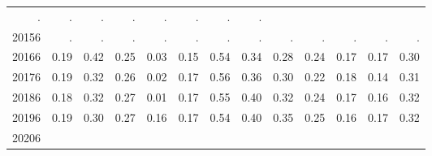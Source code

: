 \begin{table}[!h]
\begin{tabular}{lllllllllllll}
  \multicolumn{1}{r}{.} &
  \multicolumn{1}{r}{.} &
  \multicolumn{1}{r}{.} &
  \multicolumn{1}{r}{.} &
  \multicolumn{1}{r}{.} &
  \multicolumn{1}{r}{.} &
  \multicolumn{1}{r}{.} &
  \multicolumn{1}{r}{.} \\
\multicolumn{1}{l}{\hspace{1em}20156} &
  \multicolumn{1}{|r}{.} &
  \multicolumn{1}{r}{.} &
  \multicolumn{1}{r}{.} &
  \multicolumn{1}{r}{.} &
  \multicolumn{1}{r}{.} &
  \multicolumn{1}{r}{.} &
  \multicolumn{1}{r}{.} &
  \multicolumn{1}{r}{.} &
  \multicolumn{1}{r}{.} &
  \multicolumn{1}{r}{.} &
  \multicolumn{1}{r}{.} &
  \multicolumn{1}{r}{.} \\
\multicolumn{1}{l}{\hspace{1em}20166} &
  \multicolumn{1}{|r}{0.19} &
  \multicolumn{1}{r}{0.42} &
  \multicolumn{1}{r}{0.25} &
  \multicolumn{1}{r}{0.03} &
  \multicolumn{1}{r}{0.15} &
  \multicolumn{1}{r}{0.54} &
  \multicolumn{1}{r}{0.34} &
  \multicolumn{1}{r}{0.28} &
  \multicolumn{1}{r}{0.24} &
  \multicolumn{1}{r}{0.17} &
  \multicolumn{1}{r}{0.17} &
  \multicolumn{1}{r}{0.30} \\
\multicolumn{1}{l}{\hspace{1em}20176} &
  \multicolumn{1}{|r}{0.19} &
  \multicolumn{1}{r}{0.32} &
  \multicolumn{1}{r}{0.26} &
  \multicolumn{1}{r}{0.02} &
  \multicolumn{1}{r}{0.17} &
  \multicolumn{1}{r}{0.56} &
  \multicolumn{1}{r}{0.36} &
  \multicolumn{1}{r}{0.30} &
  \multicolumn{1}{r}{0.22} &
  \multicolumn{1}{r}{0.18} &
  \multicolumn{1}{r}{0.14} &
  \multicolumn{1}{r}{0.31} \\
\multicolumn{1}{l}{\hspace{1em}20186} &
  \multicolumn{1}{|r}{0.18} &
  \multicolumn{1}{r}{0.32} &
  \multicolumn{1}{r}{0.27} &
  \multicolumn{1}{r}{0.01} &
  \multicolumn{1}{r}{0.17} &
  \multicolumn{1}{r}{0.55} &
  \multicolumn{1}{r}{0.40} &
  \multicolumn{1}{r}{0.32} &
  \multicolumn{1}{r}{0.24} &
  \multicolumn{1}{r}{0.17} &
  \multicolumn{1}{r}{0.16} &
  \multicolumn{1}{r}{0.32} \\
\multicolumn{1}{l}{\hspace{1em}20196} &
  \multicolumn{1}{|r}{0.19} &
  \multicolumn{1}{r}{0.30} &
  \multicolumn{1}{r}{0.27} &
  \multicolumn{1}{r}{0.16} &
  \multicolumn{1}{r}{0.17} &
  \multicolumn{1}{r}{0.54} &
  \multicolumn{1}{r}{0.40} &
  \multicolumn{1}{r}{0.35} &
  \multicolumn{1}{r}{0.25} &
  \multicolumn{1}{r}{0.16} &
  \multicolumn{1}{r}{0.17} &
  \multicolumn{1}{r}{0.32} \\
\multicolumn{1}{l}{\hspace{1em}20206} &

\end{tabular}
\end{table}
